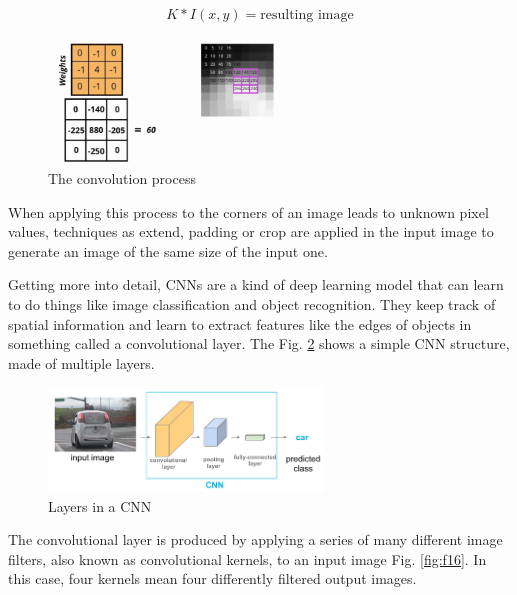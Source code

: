 \documentclass{article}
\begin{document}
\[K * I(x,y) = \text{resulting image}\]

\begin{figure}[ht]
    \centering
    \includegraphics[width=0.55\textwidth,height=0.55\textheight,keepaspectratio]{images/convolution.png}
    \captionsetup{justification=centering}
    \caption{The convolution process}
    \label{fig:f14}
\end{figure}

When applying this process to the corners of an image leads to unknown pixel values, techniques as extend, padding or crop are applied in the input image to generate an image of the same size of the input one. 

Getting more into detail, CNNs are a kind of deep learning model that can learn to do things like image classification and object recognition. They keep track of spatial information and learn to extract features like the edges of objects in something called a convolutional layer. The Fig. \ref{fig:f15} shows a simple CNN structure, made of multiple layers.

\begin{figure}[ht]
    \centering
    \includegraphics[width=0.65\textwidth,height=0.65\textheight,keepaspectratio]{images/layers_cnn.png}
    \captionsetup{justification=centering}
    \caption{Layers in a CNN}
    \label{fig:f15}
\end{figure}

The convolutional layer is produced by applying a series of many different image filters, also known as convolutional kernels, to an input image Fig. \ref{fig:f16}. In this case, four kernels mean four differently filtered output images.
\end{document}
